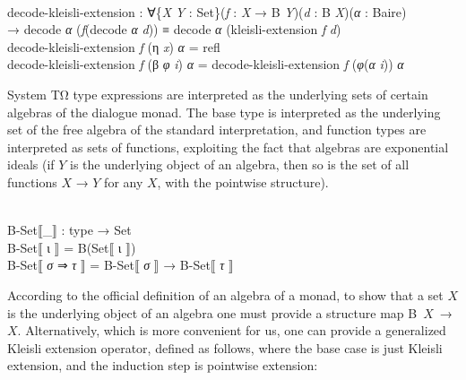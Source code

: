 \documentclass{entcs} \usepackage{prentcsmacro}
\newcommand{\AgdaC}[1]{\mbox{#1}}
\newcommand{\AgdaFontStyle}[1]{\textsf{#1}}
\newcommand{\AgdaBoundFontStyle}[1]{\textit{#1}}
\newcommand{\AgdaSymbol}      [1]{\textcolor{AgdaSymbol}{#1}}
\newcommand{\AgdaPrimitiveType}[1]
    {\AgdaFontStyle{\textcolor{AgdaPrimitiveType}{#1}}}
\newcommand{\AgdaBound}    [1]{\AgdaBoundFontStyle{\textcolor{AgdaBound}{#1}}}
\newcommand{\AgdaInductiveConstructor}[1]
    {\AgdaFontStyle{\textcolor{AgdaInductiveConstructor}{#1}}}
\newcommand{\AgdaDatatype} [1]{\AgdaFontStyle{\textcolor{AgdaDatatype}{#1}}}
\newcommand{\AgdaFunction} [1]{\AgdaFontStyle{\textcolor{AgdaFunction}{#1}}}
\newcommand{\AgdaIndent}[1]{\quad}
\newcommand{\AgdaCodeStyle}{\small}
\newenvironment{code}%
{\noindent\AgdaCodeStyle\pboxed}%
{\endpboxed\par\noindent%
\ignorespacesafterend}
\begin{document}
\begin{code}\>\<%
\\
\>\AgdaFunction{decode-kleisli-extension} \AgdaSymbol{:} \AgdaSymbol{∀\{}\AgdaBound{X} \AgdaBound{Y} \AgdaSymbol{:} \AgdaPrimitiveType{Set}\AgdaSymbol{\}(}\AgdaBound{f} \AgdaSymbol{:} \AgdaBound{X} \AgdaSymbol{→} \AgdaFunction{B} \AgdaBound{Y}\AgdaSymbol{)(}\AgdaBound{d} \AgdaSymbol{:} \AgdaFunction{B} \AgdaBound{X}\AgdaSymbol{)(}\AgdaBound{α} \AgdaSymbol{:} \AgdaFunction{Baire}\AgdaSymbol{)} \<[73]%
\>[73]\<%
\\
\>[0]\AgdaIndent{2}{}\<[2]%
\>[2]\AgdaSymbol{→} \AgdaFunction{decode} \AgdaBound{α} \AgdaSymbol{(}\AgdaBound{f}\AgdaSymbol{(}\AgdaFunction{decode} \AgdaBound{α} \AgdaBound{d}\AgdaSymbol{))} \AgdaDatatype{≡} \AgdaFunction{decode} \AgdaBound{α} \AgdaSymbol{(}\AgdaFunction{kleisli-extension} \AgdaBound{f} \AgdaBound{d}\AgdaSymbol{)}\<%
\\
\>\AgdaFunction{decode-kleisli-extension} \AgdaBound{f} \AgdaSymbol{(}\AgdaInductiveConstructor{η} \AgdaBound{x}\AgdaSymbol{)} \<[35]%
\>[35]\AgdaBound{α} \AgdaSymbol{=} \AgdaInductiveConstructor{refl}\<%
\\
\>\AgdaFunction{decode-kleisli-extension} \AgdaBound{f} \AgdaSymbol{(}\AgdaInductiveConstructor{β} \AgdaBound{φ} \AgdaBound{i}\AgdaSymbol{)} \AgdaBound{α} \AgdaSymbol{=} \AgdaFunction{decode-kleisli-extension} \AgdaBound{f} \AgdaSymbol{(}\AgdaBound{φ}\AgdaSymbol{(}\AgdaBound{α} \AgdaBound{i}\AgdaSymbol{))} \AgdaBound{α}\<%
\\
\>\<\end{code}
System TΩ type expressions are interpreted as the underlying sets of
certain algebras of the dialogue monad. The base type is interpreted
as the underlying set of the free algebra of the standard interpretation, and function types
are interpreted as sets of functions,
exploiting the fact that algebras are exponential ideals (if $Y$ is
the underlying object of an algebra, then so is the set of all
functions $X$ → $Y$ for any $X$, with the pointwise structure).

\begin{code}\>\<%
\\
\>\AgdaFunction{B-Set⟦\_⟧} \AgdaSymbol{:} \AgdaDatatype{type} \AgdaSymbol{→} \AgdaPrimitiveType{Set}\<%
\\
\>\AgdaFunction{B-Set⟦} \AgdaInductiveConstructor{ι} \AgdaFunction{⟧} \AgdaSymbol{=} \AgdaFunction{B}\AgdaSymbol{(}\AgdaFunction{Set⟦} \AgdaInductiveConstructor{ι} \AgdaFunction{⟧}\AgdaSymbol{)}\<%
\\
\>\AgdaFunction{B-Set⟦} \AgdaBound{σ} \AgdaInductiveConstructor{⇒} \AgdaBound{τ} \AgdaFunction{⟧} \AgdaSymbol{=} \AgdaFunction{B-Set⟦} \AgdaBound{σ} \AgdaFunction{⟧} \AgdaSymbol{→} \AgdaFunction{B-Set⟦} \AgdaBound{τ} \AgdaFunction{⟧}\<%
\\
\>\<\end{code}
According to the official definition of an algebra of a monad, to show
that a set $X$ is the underlying object of an algebra one must provide a
structure map \AgdaC{B $X$ → $X$}. Alternatively, which is more
convenient for us, one can provide a generalized Kleisli extension
operator, defined as follows, where the base case is just Kleisli
extension, and the induction step is pointwise extension:
\end{document}
